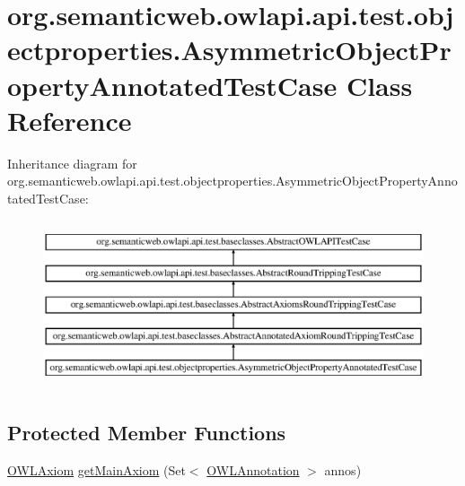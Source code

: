 \hypertarget{classorg_1_1semanticweb_1_1owlapi_1_1api_1_1test_1_1objectproperties_1_1_asymmetric_object_property_annotated_test_case}{\section{org.\-semanticweb.\-owlapi.\-api.\-test.\-objectproperties.\-Asymmetric\-Object\-Property\-Annotated\-Test\-Case Class Reference}
\label{classorg_1_1semanticweb_1_1owlapi_1_1api_1_1test_1_1objectproperties_1_1_asymmetric_object_property_annotated_test_case}
}
Inheritance diagram for org.\-semanticweb.\-owlapi.\-api.\-test.\-objectproperties.\-Asymmetric\-Object\-Property\-Annotated\-Test\-Case\-:\begin{figure}[H]
\begin{center}
\leavevmode
\includegraphics[height=5.000000cm]{classorg_1_1semanticweb_1_1owlapi_1_1api_1_1test_1_1objectproperties_1_1_asymmetric_object_property_annotated_test_case}
\end{center}
\end{figure}
\subsection*{Protected Member Functions}
\begin{DoxyCompactItemize}
\item 
\hyperlink{interfaceorg_1_1semanticweb_1_1owlapi_1_1model_1_1_o_w_l_axiom}{O\-W\-L\-Axiom} \hyperlink{classorg_1_1semanticweb_1_1owlapi_1_1api_1_1test_1_1objectproperties_1_1_asymmetric_object_property_annotated_test_case_a4733e33fc5fb51fcb11fb4d65f2ed0c9}{get\-Main\-Axiom} (Set$<$ \hyperlink{interfaceorg_1_1semanticweb_1_1owlapi_1_1model_1_1_o_w_l_annotation}{O\-W\-L\-Annotation} $>$ annos)
\end{DoxyCompactItemize}

